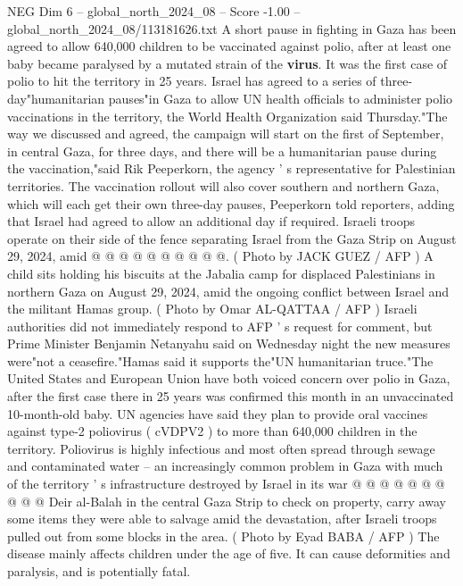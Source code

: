 \begin{textsample}{NEG Dim 6 – global\_north\_2024\_08 – Score -1.00 – global\_north\_2024\_08/113181626.txt}  \label{ex:f6_neg_166}
A short pause in fighting in Gaza has been agreed to allow 640,000 children to be vaccinated against polio, after at least one baby became paralysed by a mutated strain of the \textbf{virus}.
It was the first case of polio to hit the territory in 25 years.
Israel has agreed to a series of three-day"humanitarian pauses"in Gaza to allow UN health officials to administer polio vaccinations in the territory, the World Health Organization said Thursday."The way we discussed and agreed, the campaign will start on the first of September, in central Gaza, for three days, and there will be a humanitarian pause during the vaccination,"said Rik Peeperkorn, the agency ' s representative for Palestinian territories.
The vaccination rollout will also cover southern and northern Gaza, which will each get their own three-day pauses, Peeperkorn told reporters, adding that Israel had agreed to allow an additional day if required.
Israeli troops operate on their side of the fence separating Israel from the Gaza Strip on August 29, 2024, amid @ @ @ @ @ @ @ @ @ @. ( Photo by JACK GUEZ / AFP ) A child sits holding his biscuits at the Jabalia camp for displaced Palestinians in northern Gaza on August 29, 2024, amid the ongoing conflict between Israel and the militant Hamas group. ( Photo by Omar AL-QATTAA / AFP ) Israeli authorities did not immediately respond to AFP ' s request for comment, but Prime Minister Benjamin Netanyahu said on Wednesday night the new measures were"not a ceasefire."Hamas said it supports the"UN humanitarian truce."The United States and European Union have both voiced concern over polio in Gaza, after the first case there in 25 years was confirmed this month in an unvaccinated 10-month-old baby.
UN agencies have said they plan to provide oral vaccines against type-2 poliovirus ( cVDPV2 ) to more than 640,000 children in the territory.
Poliovirus is highly infectious and most often spread through sewage and contaminated water -- an increasingly common problem in Gaza with much of the territory ' s infrastructure destroyed by Israel in its war @ @ @ @ @ @ @ @ @ @ Deir al-Balah in the central Gaza Strip to check on property, carry away some items they were able to salvage amid the devastation, after Israeli troops pulled out from some blocks in the area. ( Photo by Eyad BABA / AFP ) The disease mainly affects children under the age of five.
It can cause deformities and paralysis, and is potentially fatal.

\end{textsample}
